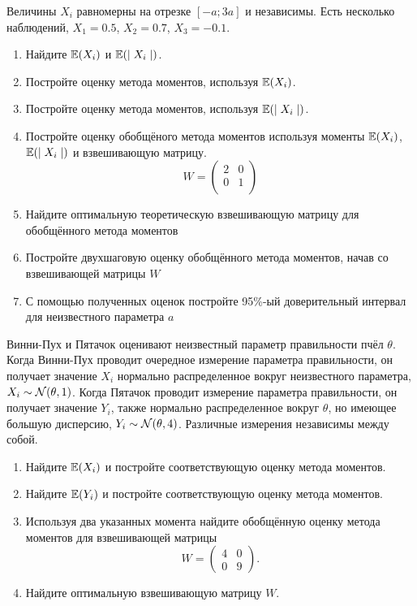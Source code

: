 \begin{problem}
Величины $X_i$ равномерны на отрезке $[-a; 3a]$ и независимы. Есть несколько наблюдений, $X_1=0.5$, $X_2=0.7$, $X_3=-0.1$.

\begin{enumerate}
\item Найдите $\operatorname{\mathbb E}(X_i)$ и $\operatorname{\mathbb E}( \mid X_i \mid )$.
\item Постройте оценку метода моментов, используя $\operatorname{\mathbb E}(X_i)$.
\item Постройте оценку метода моментов, используя $\operatorname{\mathbb E}( \mid X_i \mid )$.
\item Постройте оценку обобщёного метода моментов используя моменты $\operatorname{\mathbb E}(X_i)$, $\operatorname{\mathbb E}( \mid X_i \mid )$ и взвешивающую матрицу.
\[
W=\begin{pmatrix}
2 & 0 \\
0 & 1 \\
\end{pmatrix}
\]
\item Найдите оптимальную теоретическую взвешивающую матрицу для обобщённого метода моментов
\item Постройте двухшаговую оценку обобщённого метода моментов, начав со взвешивающей матрицы $W$
\item С помощью полученных оценок постройте 95\%-ый доверительный интервал для неизвестного параметра $a$

\end{enumerate}

\begin{sol}
\end{sol}
\end{problem}




\begin{problem}
Винни-Пух и Пятачок оценивают неизвестный параметр правильности пчёл $\theta$. Когда Винни-Пух проводит очередное измерение параметра правильности, он получает значение $X_i$ нормально распределенное вокруг неизвестного параметра, $X_i \sim \mathcal{N}(\theta, 1)$. Когда Пятачок проводит измерение параметра правильности, он получает значение $Y_i$, также нормально распределенное вокруг $\theta$, но имеющее большую дисперсию, $Y_i \sim \mathcal{N}(\theta, 4)$. Различные измерения независимы между собой.
\begin{enumerate}
\item Найдите $\operatorname{\mathbb E}(X_i)$ и постройте соответствующую оценку метода моментов.
\item Найдите $\operatorname{\mathbb E}(Y_i)$ и постройте соответствующую оценку метода моментов.
\item Используя два указанных момента найдите обобщённую оценку метода моментов для взвешивающей матрицы
\[
W = \begin{pmatrix}
4 & 0 \\
0 & 9
\end{pmatrix}.
\]
\item Найдите оптимальную взвешивающую матрицу $W$.
\end{enumerate}
\begin{sol}
\end{sol}
\end{problem}


